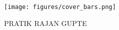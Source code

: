 
\begin{titlepage}
    \pagecolor{myOrange}\afterpage{\nopagecolor}
    \begin{addmargin}[-1cm]{-3cm}
        \linespread{1.5}

        \hfill

        {
          \begin{flushleft}
            \par
          \end{flushleft}
        }
        \texttt{[image: figures/cover\_bars.png]}
        
        \vspace{81mm}

        \sffamily\huge{PRATIK RAJAN GUPTE}

        \vfill




        \vfill

  \end{addmargin}
\end{titlepage}

\nopagecolor
